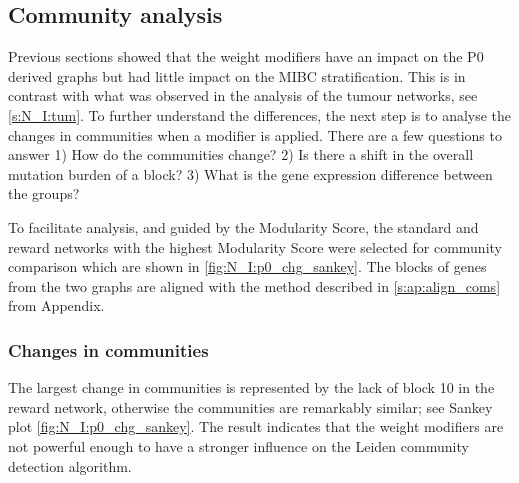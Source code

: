 
\subsection{Community analysis} \label{s:N_I:com_analysis}

Previous sections showed that the weight modifiers have an impact on the P0 derived graphs but had little impact on the MIBC stratification. This is in contrast with what was observed in the analysis of the tumour networks, see \cref{s:N_I:tum}. To further understand the differences, the next step is to analyse the changes in communities when a modifier is applied. There are a few questions to answer 1) How do the communities change? 2) Is there a shift in the overall mutation burden of a block? 3) What is the gene expression difference between the groups? 

To facilitate analysis, and guided by the Modularity Score, the standard and reward networks with the highest Modularity Score were selected for community comparison which are shown in \cref{fig:N_I:p0_chg_sankey}. The blocks of genes from the two graphs are aligned with the method described in \cref{s:ap:align_coms} from Appendix.

\subsubsection*{Changes in communities}

The largest change in communities is represented by the lack of block 10 in the reward network, otherwise the communities are remarkably similar; see  Sankey plot \cref{fig:N_I:p0_chg_sankey}. The result indicates that the weight modifiers are not powerful enough to have a stronger influence on the Leiden community detection algorithm. 

